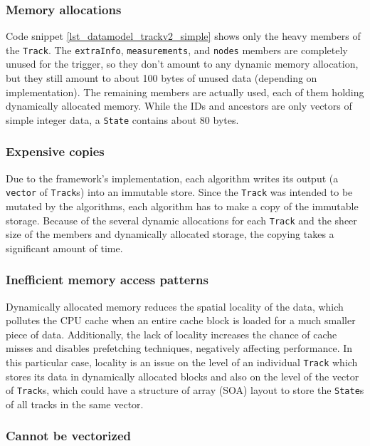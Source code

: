 \documentclass[12pt]{article}
\newcommand{\code}[1]{\texttt{#1}}
\begin{document}
\subsubsection{Memory allocations}

Code snippet \ref{lst_datamodel_trackv2_simple} shows only the heavy members of the \code{Track}. The \code{extraInfo}, \code{measurements}, and \code{nodes} members are completely unused for the trigger, so they don't amount to any dynamic memory allocation, but they still amount to about 100 bytes of unused data (depending on implementation). The remaining members are actually used, each of them holding dynamically allocated memory. While the IDs and ancestors are only vectors of simple integer data, a \code{State} contains about 80 bytes.

\subsubsection{Expensive copies}

Due to the framework's implementation, each algorithm writes its output (a \code{vector} of \code{Track}s) into an immutable store. Since the \code{Track} was intended to be mutated by the algorithms, each algorithm has to make a copy of the immutable storage. Because of the several dynamic allocations for each \code{Track} and the sheer size of the members and dynamically allocated storage, the copying takes a significant amount of time.

\subsubsection{Inefficient memory access patterns}

Dynamically allocated memory reduces the spatial locality of the data, which pollutes the CPU cache when an entire cache block is loaded for a much smaller piece of data. Additionally, the lack of locality increases the chance of cache misses and disables prefetching techniques, negatively affecting performance. In this particular case, locality is an issue on the level of an individual \code{Track} which stores its data in dynamically allocated blocks and also on the level of the vector of \code{Track}s, which could have a structure of array (SOA) layout to store the \code{State}s of all tracks in the same vector.

\subsubsection{Cannot be vectorized}
\end{document}
